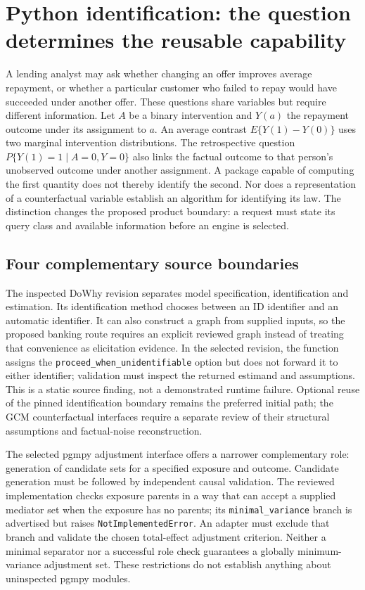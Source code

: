 \section{Python identification: the question determines the reusable capability}
\label{exec18:pyid-question}

A lending analyst may ask whether changing an offer improves average repayment,
or whether a particular customer who failed to repay would have succeeded under
another offer. These questions share variables but require different information.
Let $A$ be a binary intervention and $Y(a)$ the repayment outcome under its
assignment to $a$. An average contrast $E\{Y(1)-Y(0)\}$ uses two marginal
intervention distributions. The retrospective question
$P\{Y(1)=1\mid A=0,Y=0\}$ also links the factual outcome to that person's
unobserved outcome under another assignment. A package capable of computing the
first quantity does not thereby identify the second. Nor does a representation
of a counterfactual variable establish an algorithm for identifying its law.
The distinction changes the proposed product boundary: a request must state its
query class and available information before an engine is selected.
\citep{exec13_y0_dsl,exec18_pyid_contract}

\subsection{Four complementary source boundaries}
\label{exec18:pyid-packages}

The inspected DoWhy revision separates model specification, identification and
estimation. Its identification method chooses between an ID identifier and an
automatic identifier. It can also construct a graph from supplied inputs, so
the proposed banking route requires an explicit reviewed graph instead of
treating that convenience as elicitation evidence. In the selected revision,
the function assigns the \texttt{proceed\_when\_unidentifiable} option but does
not forward it to either identifier; validation must inspect the returned
estimand and assumptions. This is a static source finding, not a demonstrated
runtime failure. Optional reuse of the pinned identification boundary remains
the preferred initial path; the GCM counterfactual interfaces require a separate
review of their structural assumptions and factual-noise reconstruction.
\citep{exec13_dowhy}

The selected pgmpy adjustment interface offers a narrower complementary role:
generation of candidate sets for a specified exposure and outcome. Candidate
generation must be followed by independent causal validation. The reviewed
implementation checks exposure parents in a way that can accept a supplied
mediator set when the exposure has no parents; its \texttt{minimal\_variance}
branch is advertised but raises \texttt{NotImplementedError}. An adapter must
exclude that branch and validate the chosen total-effect adjustment criterion.
Neither a minimal separator nor a successful role check guarantees a globally
minimum-variance adjustment set. These restrictions do not establish anything
about uninspected pgmpy modules.\citep{exec13_pgmpy_reuse_primary}

